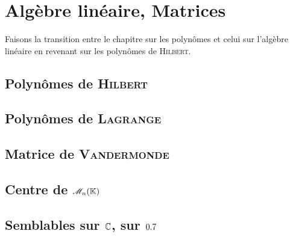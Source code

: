\chapter{Algèbre linéaire, Matrices}



\newpage

%     

Faisons la transition entre le chapitre sur les polynômes et celui sur l'algèbre linéaire en revenant sur les polynômes de \textsc{Hilbert}.

\section{Polynômes de \textsc{Hilbert}} \label{polynome_hilbert}


\section{Polynômes de \textsc{Lagrange}} 


\section{Matrice de \textsc{Vandermonde}} %


\section{Centre de \texorpdfstring{$\mathscr{M}_n(\mathbb{K})$}{l'espace des matrices carrées}}


\section{Semblables sur \texorpdfstring{$\mathbb{C}$, sur $0.7$}{C, sur R}}


